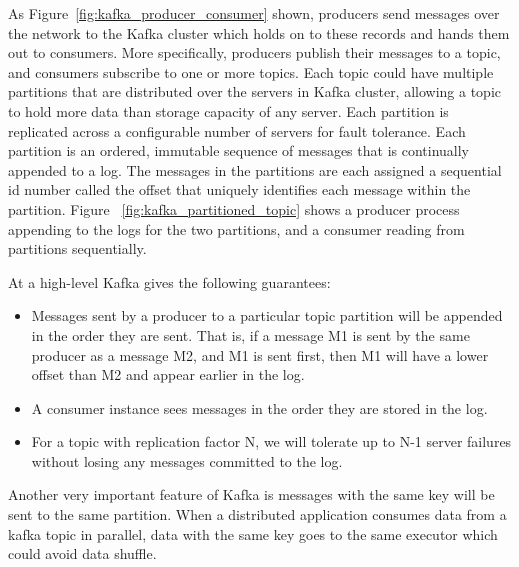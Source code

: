 As Figure~\ref{fig:kafka_producer_consumer} shown, producers send messages over the network to the Kafka cluster which holds on to these records and hands them out to consumers. More specifically, producers publish their messages to a topic, and consumers subscribe to one or more topics. Each topic could have multiple partitions that are distributed over the servers in Kafka cluster, allowing a topic to hold more data than storage capacity of any server. Each partition is replicated across a configurable number of servers for fault tolerance. Each partition is an ordered, immutable sequence of messages that is continually appended to a log. The messages in the partitions are each assigned a sequential id number called the offset that uniquely identifies each message within the partition.  Figure ~\ref{fig:kafka_partitioned_topic} shows a producer process appending to the logs for the two partitions, and a consumer reading from partitions sequentially. 

At a high-level Kafka gives the following guarantees: \cite{Kafka}
\begin{itemize}
  \item Messages sent by a producer to a particular topic partition will be appended in the order they are sent. That is, if a message M1 is sent by the same producer as a message M2, and M1 is sent first, then M1 will have a lower offset than M2 and appear earlier in the log. 
  \item A consumer instance sees messages in the order they are stored in the log.
  \item For a topic with replication factor N, we will tolerate up to N-1 server failures without losing any messages committed to the log.
\end{itemize}


Another very important feature of Kafka is messages with the same key will be sent to the same partition. When a distributed application consumes data from a kafka topic in parallel,  data with the same key goes to the same executor which could avoid data shuffle.


